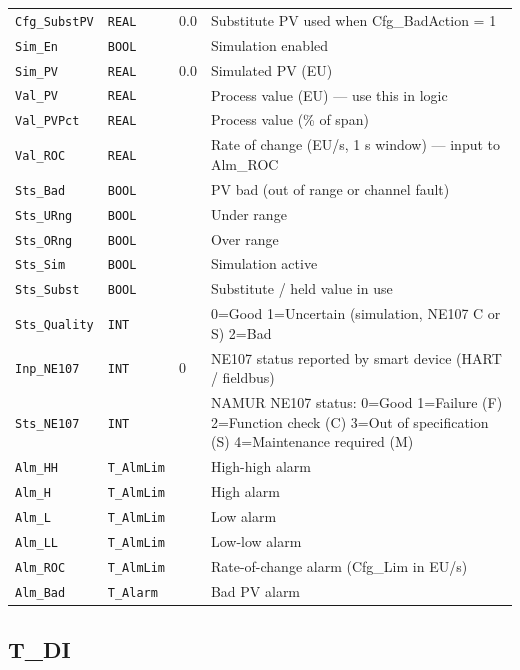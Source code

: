 \begin{small}
\begin{longtable}{@{}P{3.70cm}P{2.20cm}P{1.70cm}P{8.91cm}@{}}
\texttt{Cfg\_SubstPV} & \texttt{REAL} & 0.0 & Substitute PV used when Cfg\_BadAction = 1 \\
\texttt{Sim\_En} & \texttt{BOOL} &  & Simulation enabled \\
\texttt{Sim\_PV} & \texttt{REAL} & 0.0 & Simulated PV (EU) \\
\texttt{Val\_PV} & \texttt{REAL} &  & Process value (EU) --- use this in logic \\
\texttt{Val\_PVPct} & \texttt{REAL} &  & Process value (\% of span) \\
\texttt{Val\_ROC} & \texttt{REAL} &  & Rate of change (EU/\allowbreak{}s, 1 s window) --- input to Alm\_ROC \\
\texttt{Sts\_Bad} & \texttt{BOOL} &  & PV bad (out of range or channel fault) \\
\texttt{Sts\_URng} & \texttt{BOOL} &  & Under range \\
\texttt{Sts\_ORng} & \texttt{BOOL} &  & Over range \\
\texttt{Sts\_Sim} & \texttt{BOOL} &  & Simulation active \\
\texttt{Sts\_Subst} & \texttt{BOOL} &  & Substitute /\allowbreak{} held value in use \\
\texttt{Sts\_Quality} & \texttt{INT} &  & 0=Good 1=Uncertain (simulation, NE107 C or S) 2=Bad \\
\texttt{Inp\_NE107} & \texttt{INT} & 0 & NE107 status reported by smart device (HART /\allowbreak{} fieldbus) \\
\texttt{Sts\_NE107} & \texttt{INT} &  & NAMUR NE107 status: 0=Good 1=Failure (F) 2=Function check (C) 3=Out of specification (S) 4=Maintenance required (M) \\
\texttt{Alm\_HH} & \texttt{T\_AlmLim} &  & High-high alarm \\
\texttt{Alm\_H} & \texttt{T\_AlmLim} &  & High alarm \\
\texttt{Alm\_L} & \texttt{T\_AlmLim} &  & Low alarm \\
\texttt{Alm\_LL} & \texttt{T\_AlmLim} &  & Low-low alarm \\
\texttt{Alm\_ROC} & \texttt{T\_AlmLim} &  & Rate-of-change alarm (Cfg\_Lim in EU/\allowbreak{}s) \\
\texttt{Alm\_Bad} & \texttt{T\_Alarm} &  & Bad PV alarm \\
\bottomrule
\end{longtable}
\end{small}

\subsection{T\_DI}\label{sec:pclib-t-di}

